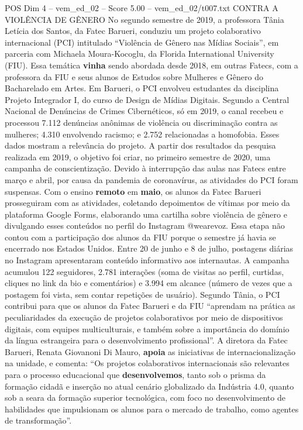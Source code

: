 \begin{textsample}{POS Dim 4 – vem\_ed\_02 – Score 5.00 – vem\_ed\_02/t007.txt}  \label{ex:f4_pos_024}
CONTRA A VIOLÊNCIA DE GÊNERO No segundo semestre de 2019, a professora Tânia Letícia dos Santos, da Fatec Barueri, conduziu um projeto colaborativo internacional (PCI) intitulado “Violência de Gênero nas Mídias Sociais”, em parceria com Michaela Moura-Kocoglu, da Florida International University (FIU).
Essa temática \textbf{vinha} sendo abordada desde 2018, em outras Fatecs, com a professora da FIU e seus alunos de Estudos sobre Mulheres e Gênero do Bacharelado em Artes.
Em Barueri, o PCI envolveu estudantes da disciplina Projeto Integrador I, do curso de Design de Mídias Digitais.
Segundo a Central Nacional de Denúncias de Crimes Cibernéticos, só em 2019, o canal recebeu e processou 7.112 denúncias anônimas de violência ou discriminação contra as mulheres; 4.310 envolvendo racismo; e 2.752 relacionadas a homofobia.
Esses dados mostram a relevância do projeto.
A partir dos resultados da pesquisa realizada em 2019, o objetivo foi criar, no primeiro semestre de 2020, uma campanha de conscientização.
Devido à interrupção das aulas nas Fatecs entre março e abril, por causa da pandemia de coronavírus, as atividades do PCI foram suspensas.
Com o ensino \textbf{remoto} em \textbf{maio}, os alunos da Fatec Barueri prosseguiram com as atividades, coletando depoimentos de vítimas por meio da plataforma Google Forms, elaborando uma cartilha sobre violência de gênero e divulgando esses conteúdos no perfil do Instagram @wearevoz.
Essa etapa não contou com a participação dos alunos da FIU porque o semestre já havia se encerrado nos Estados Unidos.
Entre 20 de junho e 8 de julho, postagens diárias no Instagram apresentaram conteúdo informativo aos internautas.
A campanha acumulou 122 seguidores, 2.781 interações (soma de visitas ao perfil, curtidas, cliques no link da bio e comentários) e 3.994 em alcance (número de vezes que a postagem foi vista, sem contar repetições de usuário).
Segundo Tânia, o PCI contribui para que os alunos da Fatec Barueri e da FIU “aprendam na prática as peculiaridades da execução de projetos colaborativos por meio de dispositivos digitais, com equipes multiculturais, e também sobre a importância do domínio da língua estrangeira para o desenvolvimento profissional”.
A diretora da Fatec Barueri, Renata Giovanoni Di Mauro, \textbf{apoia} as iniciativas de internacionalização na unidade, e comenta: “Os projetos colaborativos internacionais são relevantes para o processo educacional que \textbf{desenvolvemos}, tanto sob o prisma da formação cidadã e inserção no atual cenário globalizado da Indústria 4.0, quanto sob a seara da formação superior tecnológica, com foco no desenvolvimento de habilidades que impulsionam os alunos para o mercado de trabalho, como agentes de transformação”.

\end{textsample}

